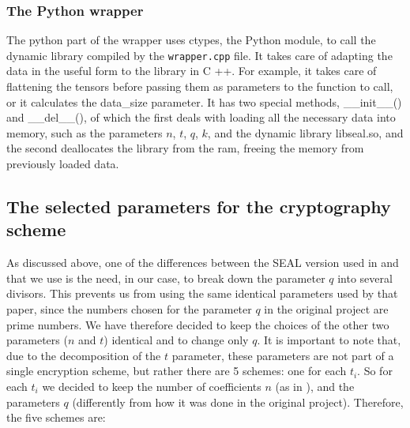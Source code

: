 \subsubsection{The Python wrapper}

The python part of the wrapper uses ctypes, the Python module, to call the dynamic library compiled by the \texttt{wrapper.cpp} file. It takes care of adapting the data in the useful form to the library in C ++. For example, it takes care of flattening the tensors before passing them as parameters to the function to call, or it calculates the data_size parameter. It has two special methods, __init__() and __del__(), of which the first deals with loading all the necessary data into memory, such as the parameters $n$, $t$, $q$, $k$, and the dynamic library libseal.so, and the second deallocates the library from the ram, freeing the memory from previously loaded data.

\subsection{The selected parameters for the cryptography scheme}

As discussed above, one of the differences between the SEAL version used in \cite{dowlin2016cryptonets} and that we use is the need, in our case, to break down the parameter $q$ into several divisors. This prevents us from using the same identical parameters used by that paper, since the numbers chosen for the parameter $q$ in the original project are prime numbers. We have therefore decided to keep the choices of the other two parameters ($n$ and $t$) identical and to change only $q$. It is important to note that, due to the decomposition of the $t$ parameter, these parameters are not part of a single encryption scheme, but rather there are 5 schemes: one for each $t_i$. So for each $t_i$ we decided to keep the number of coefficients $n$ (as in \cite{dowlin2016cryptonets}), and the parameters $q$ (differently from how it was done in the original project). Therefore, the five schemes are:

